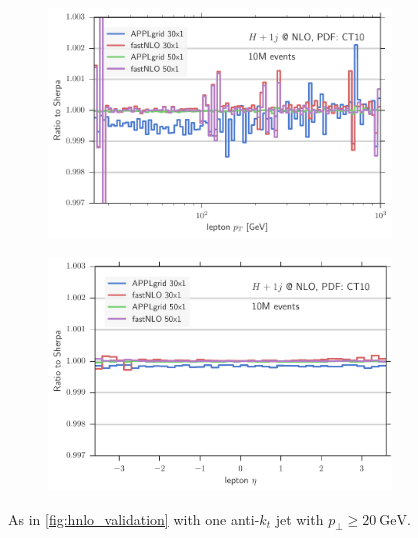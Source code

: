 \begin{figure}
\begin{subfigure}[]{0.49\textwidth}
	\includegraphics[width=\textwidth]{images/hjnlo_lpt_50v30.pdf}
\end{subfigure}
\hfill
\begin{subfigure}[]{0.49\textwidth}
	\includegraphics[width=\textwidth]{images/hjnlo_leta_50v30.pdf}
\end{subfigure}
\caption{As in \cref{fig:hnlo_validation} with one anti-$k_t$ jet with $p_\perp \geq \SI{20}{\giga\electronvolt}$.}
\label{fig:hjnlo_validation}
\end{figure}
%

